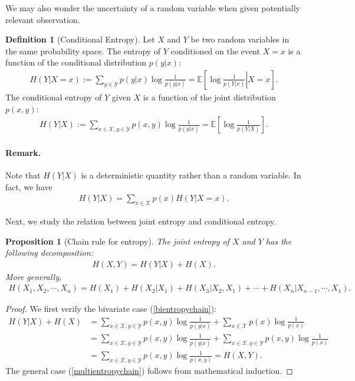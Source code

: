 \documentclass{article}
\numberwithin{equation}{section}
\newcommand{\E}{\mathbb{E}}
\renewcommand{\cal}{\mathcal}
\theoremstyle{plain}
\newtheorem{proposition}[theorem]{Proposition}
\theoremstyle{definition}
\newtheorem{definition}[theorem]{Definition}
\begin{document}
We may also wonder the uncertainty of a random variable when given potentially relevant observation.
\begin{definition}[Conditional Entropy]
Let $X$ and $Y$ be two random variables in the same probability space. The entropy of $Y$ conditioned on the event $X=x$ is a function of the conditional distribution $p(y|x)$:
\begin{align*}
	H(Y|X=x):=\sum_{y\in\mathcal{Y}}p(y|x)\log\frac{1}{p(y|x)}=\E\left[\left.\log\frac{1}{p(Y|x)}\right|X=x\right].
\end{align*}
The conditional entropy of $Y$ given $X$ is a function of the joint distribution $p(x,y)$: 
\begin{align*}
	H(Y|X):=\sum_{x\in\mathcal{X},y\in\mathcal{Y}}p(x,y)\log\frac{1}{p(y|x)}=\E\left[\log\frac{1}{p(Y|X)}\right].
\end{align*}
\end{definition}
\paragraph{Remark.} Note that $H(Y|X)$ is a deterministic quantity rather than a random variable. In fact, we have
\begin{align*}
	H(Y|X)=\sum_{x\in\cal{X}}p(x)H(Y|X=x).
\end{align*}

Next, we study the relation between joint entropy and conditional entropy.
\begin{proposition}[Chain rule for entropy]
The joint entropy of $X$ and $Y$ has the following decomposition:
\begin{align}
	H(X,Y)=H(Y|X)+H(X).\label{bientropychain}
\end{align}
More generally,
\begin{align}
	H(X_1,X_2,\cdots,X_n)=H(X_1)+H(X_2|X_1)+H(X_3|X_2,X_1)+\cdots+H(X_n|X_{n-1},\cdots,X_1).\label{multientropychain}
\end{align}
\end{proposition}
\begin{proof}
We first verify the bivariate case (\ref{bientropychain}):
\begin{align*}
	H(Y|X)+H(X)&=\sum_{x\in\mathcal{X},y\in\mathcal{Y}}p(x,y)\log\frac{1}{p(y|x)}+\sum_{x\in\mathcal{X}}p(x)\log\frac{1}{p(x)}\\
	&=\sum_{x\in\mathcal{X},y\in\mathcal{Y}}p(x,y)\log\frac{1}{p(y|x)}+\sum_{x\in\mathcal{X},y\in\mathcal{Y}}p(x,y)\log\frac{1}{p(x)}\\
	&=\sum_{x\in\mathcal{X},y\in\mathcal{Y}}p(x,y)\log\frac{1}{p(x,y)}=H(X,Y).
\end{align*}
The general case (\ref{multientropychain}) follows from mathematical induction.
\end{proof}
\end{document}
